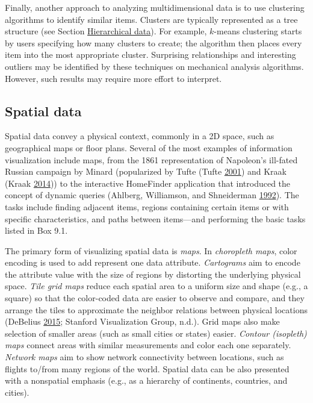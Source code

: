 \documentclass[]{krantz}
\begin{document}
Finally, another approach to analyzing multidimensional data is to use
clustering algorithms to identify similar items. Clusters are typically
represented as a tree structure (see Section
\protect\hyperlink{sec:viz-2.5}{Hierarchical data}). For example,
\(k\)-means clustering starts by users specifying how many clusters to
create; the algorithm then places every item into the most appropriate
cluster. Surprising relationships and interesting outliers may be
identified by these techniques on mechanical analysis algorithms.
However, such results may require more effort to interpret.

\subsection{Spatial data}\label{sec:viz-2.2}

Spatial data convey a physical context, commonly in a 2D space, such as
geographical maps or floor plans. Several of the most examples of
information visualization include maps, from the 1861 representation of
Napoleon's ill-fated Russian campaign by Minard (popularized by Tufte
(Tufte \protect\hyperlink{ref-edward2001visual}{2001}) and Kraak (Kraak
\protect\hyperlink{ref-Kraak2014}{2014})) to the interactive HomeFinder
application that introduced the concept of dynamic queries (Ahlberg,
Williamson, and Shneiderman
\protect\hyperlink{ref-ahlberg1992dynamic}{1992}). The tasks include
finding adjacent items, regions containing certain items or with
specific characteristics, and paths between items---and performing the
basic tasks listed in Box 9.1.

The primary form of visualizing spatial data is \emph{maps}. In
\emph{choropleth maps}, color encoding is used to add represent one data
attribute. \emph{Cartograms} aim to encode the attribute value with the
size of regions by distorting the underlying physical space. \emph{Tile
grid maps} reduce each spatial area to a uniform size and shape (e.g., a
square) so that the color-coded data are easier to observe and compare,
and they arrange the tiles to approximate the neighbor relations between
physical locations (DeBelius \protect\hyperlink{ref-DeBelius2015}{2015};
Stanford Visualization Group, n.d.). Grid maps also make selection of
smaller areas (such as small cities or states) easier. \emph{Contour
(isopleth) maps} connect areas with similar measurements and color each
one separately. \emph{Network maps} aim to show network connectivity
between locations, such as flights to/from many regions of the world.
Spatial data can be also presented with a nonspatial emphasis (e.g., as
a hierarchy of continents, countries, and cities).
\end{document}
